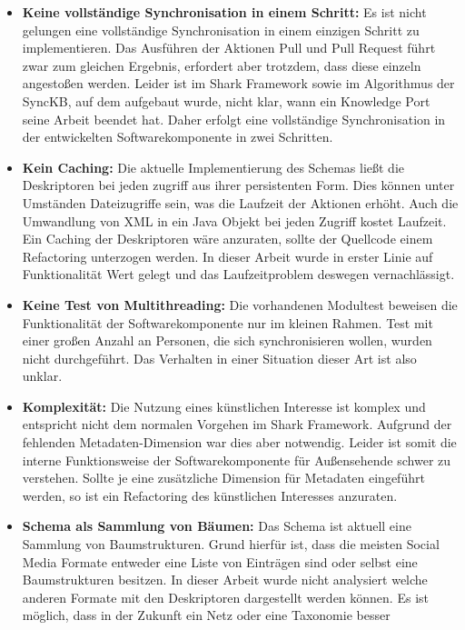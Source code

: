 \documentclass[a4paper]{article}
\begin{document}
	\begin{itemize}
		\item \textbf{Keine vollständige Synchronisation in einem Schritt:}
		Es ist nicht gelungen eine vollständige Synchronisation in einem
		einzigen Schritt zu implementieren. Das Ausführen der Aktionen Pull
		und Pull Request führt zwar zum gleichen Ergebnis, erfordert
		aber trotzdem, dass diese einzeln angestoßen werden. Leider ist im
		Shark Framework sowie im Algorithmus der SyncKB, auf dem aufgebaut wurde, 
		nicht klar, wann ein Knowledge Port seine Arbeit beendet hat. Daher erfolgt
		eine vollständige Synchronisation in der entwickelten Softwarekomponente in 
		zwei Schritten.
		\item \textbf{Kein Caching:} Die aktuelle Implementierung des Schemas
		ließt die Deskriptoren bei jeden zugriff aus ihrer persistenten
		Form. Dies können unter Umständen Dateizugriffe sein, was die Laufzeit
		der Aktionen erhöht. Auch die Umwandlung von XML in ein Java Objekt bei
		jeden Zugriff kostet Laufzeit. Ein Caching der Deskriptoren wäre
		anzuraten, sollte der Quellcode einem Refactoring unterzogen werden.
		In dieser Arbeit wurde in erster Linie auf Funktionalität Wert gelegt
		und das Laufzeitproblem deswegen vernachlässigt. 
		\item \textbf{Keine Test von Multithreading:} Die vorhandenen Modultest
		beweisen die Funktionalität der Softwarekomponente nur im kleinen Rahmen.
		Test mit einer großen Anzahl an Personen, die sich synchronisieren wollen,
		wurden nicht durchgeführt. Das Verhalten in einer Situation dieser Art ist
		also unklar.
		\item \textbf{Komplexität:} Die Nutzung eines künstlichen Interesse
		ist komplex und entspricht nicht dem normalen Vorgehen im Shark
		Framework. Aufgrund der fehlenden Metadaten-Dimension war dies aber
		notwendig. Leider ist somit die interne Funktionsweise der
		Softwarekomponente für Außensehende schwer zu verstehen. Sollte
		je eine zusätzliche Dimension für Metadaten eingeführt werden, so ist
		ein Refactoring des künstlichen Interesses anzuraten.
		\item \textbf{Schema als Sammlung von Bäumen:} Das Schema ist aktuell
		eine Sammlung von Baumstrukturen. Grund hierfür ist, dass die meisten
		Social Media Formate entweder eine Liste von Einträgen sind oder selbst
		eine Baumstrukturen besitzen. In dieser Arbeit wurde nicht analysiert 
		welche anderen Formate mit den Deskriptoren dargestellt werden können.
		Es ist möglich, dass in der Zukunft ein Netz oder eine Taxonomie besser 

\end{itemize}
\end{document}
